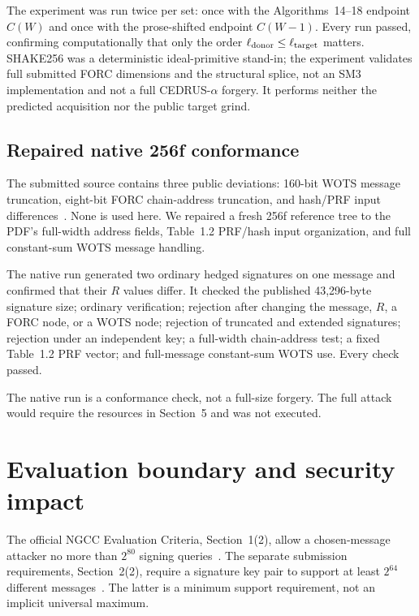 \documentclass[11pt,a4paper]{article}
\begin{document}
The experiment was run twice per set: once with the Algorithms~14--18 endpoint
$C(W)$ and once with the prose-shifted endpoint $C(W-1)$.  Every run passed,
confirming computationally that only the order
$\ell_{\rm donor}\leq\ell_{\rm target}$ matters.  SHAKE256 was a deterministic
ideal-primitive stand-in; the experiment validates full submitted FORC
dimensions and the structural splice, not an SM3 implementation and not a
full CEDRUS-$\alpha$ forgery.  It performs neither the predicted acquisition
nor the public target grind.

\subsection{Repaired native 256f conformance}

The submitted source contains three public deviations: 160-bit WOTS message
truncation, eight-bit FORC chain-address truncation, and hash/PRF input
differences~\cite{ngcc-cedrus}.  None is used here.  We repaired a fresh 256f
reference tree to the PDF's full-width address fields, Table~1.2 PRF/hash input
organization, and full constant-sum WOTS message handling.

The native run generated two ordinary hedged signatures on one message and
confirmed that their $R$ values differ.  It checked the published 43,296-byte
signature size; ordinary verification; rejection after changing the message,
$R$, a FORC node, or a WOTS node; rejection of truncated and extended
signatures; rejection under an independent key; a full-width chain-address
test; a fixed Table~1.2 PRF vector; and full-message constant-sum WOTS use.
Every check passed.

The native run is a conformance check, not a full-size forgery.  The full attack
would require the resources in Section~5 and was not executed.

\section{Evaluation boundary and security impact}

The official NGCC Evaluation Criteria, Section~1(2), allow a chosen-message
attacker no more than $2^{80}$ signing queries~\cite{ngcc-criteria}.  The
separate submission requirements, Section~2(2), require a signature key pair
to support at least $2^{64}$ different messages~\cite{ngcc-requirements}.
The latter is a minimum support requirement, not an implicit universal
maximum.
\end{document}
